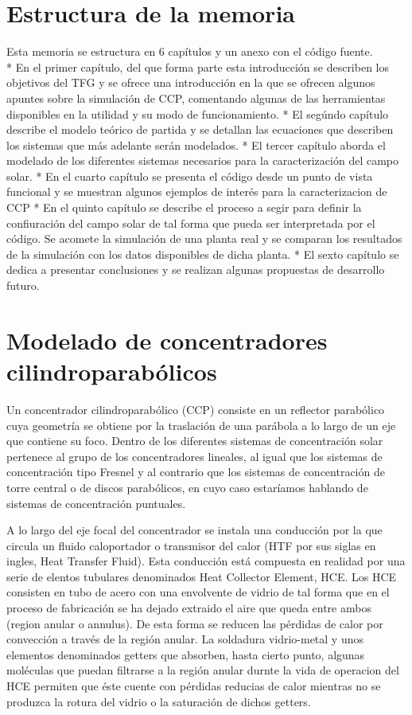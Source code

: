 \documentclass[12pt]{report} %
\begin{document}
\section{Estructura de la memoria}
Esta memoria se estructura en 6 capítulos y un anexo con el código fuente.\\
* En el primer capítulo, del que forma parte esta introducción se describen los objetivos del TFG y se ofrece una introducción en la que se ofrecen algunos apuntes sobre la simulación de CCP, comentando algunas de las herramientas disponibles en la utilidad y su modo de funcionamiento. * El segúndo capítulo describe el modelo teórico de partida y se detallan las ecuaciones que describen los sistemas que más adelante serán modelados. * El tercer capítulo aborda el modelado de los
diferentes sistemas necesarios para la caracterización del campo solar.
* En el cuarto capítulo se presenta el código desde un punto de vista funcional y se muestran algunos ejemplos de interés para la caracterizacion de CCP * En el quinto capítulo se describe el proceso a segir para definir la confiuración del campo solar de tal forma que pueda ser interpretada por el código. Se acomete la simulación de una planta real y se comparan los resultados de la simulación con los datos disponibles de dicha planta. * El sexto capítulo se dedica a presentar conclusiones y se realizan algunas propuestas de desarrollo futuro.

\section{Modelado de concentradores cilindroparabólicos}
Un concentrador cilindroparabólico (CCP) consiste en un reflector parabólico cuya geometría se obtiene por la traslación de una parábola a lo largo de un eje que contiene su foco. Dentro de los diferentes sistemas de concentración solar pertenece al grupo de los concentradores lineales, al igual que los sistemas de concentración tipo Fresnel y al contrario que los sistemas de concentración de torre central o de discos parabólicos, en cuyo caso estaríamos hablando de sistemas de
concentración puntuales.

A lo largo del eje focal del concentrador se instala una conducción por la que circula un fluido caloportador o transmisor del calor (HTF por sus siglas en ingles, Heat Transfer Fluid). Esta conducción está compuesta en realidad por una serie de elentos tubulares denominados Heat Collector Element, HCE. Los HCE consisten en tubo de acero con una envolvente de vidrio de tal forma que en el proceso de fabricación se ha dejado extraido el aire que queda entre ambos (region anular o annulus). De esta forma se reducen las pérdidas de calor por convección a través de la región anular. La soldadura vidrio-metal y unos elementos denominados getters que absorben, hasta cierto punto, algunas moléculas que puedan filtrarse a la región anular durnte la vida de operacion del HCE permiten que éste cuente con pérdidas reducias de calor mientras no se produzca la rotura del vidrio o la saturación de dichos getters. 
\end{document}
